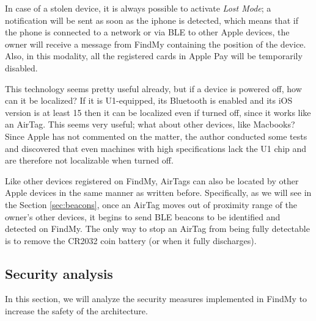 \documentclass[english]{article}
\begin{document}
In case of a stolen device, it is always possible to activate \textit{Lost Mode}; a notification will be sent as soon as the iphone is detected, which means that if the phone is connected to a network or via BLE to other Apple devices, the owner will receive a message from FindMy containing the position of the device. Also, in this modality, all the registered cards in Apple Pay will be temporarily disabled.

This technology seems pretty useful already, but if a device is powered off, how can it be localized? If it is U1-equipped, its Bluetooth is enabled and its iOS version is at least 15 then it can be localized even if turned off, since it works like an AirTag. This seems very useful; what about other devices, like Macbooks? Since Apple has not commented on the matter, the author conducted some tests and discovered that even machines with high specifications lack the U1 chip and are therefore not localizable when turned off. 

Like other devices registered on FindMy, AirTags can also be located by other Apple devices in the same manner as written before. Specifically, as we will see in the Section \ref{sec:beacons}, once an AirTag moves out of proximity range of the owner's other devices, it begins to send BLE beacons to be identified and detected on FindMy. The only way to stop an AirTag from being fully detectable is to remove the CR2032 coin battery (or when it fully discharges).

\subsection{Security analysis}
In this section, we will analyze the security measures implemented in FindMy to increase the safety of the architecture.
\end{document}
